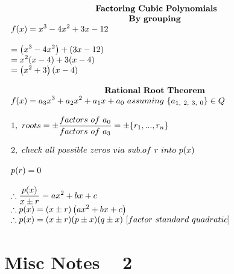 \documentclass{article}
\begin{document}
\begin{multicols}{2}
    \columnbreak
    \noindent 
    \[
    \begin{array}{>{\displaystyle}l}
        \\
        \\
        \\
        \centerline{$\mathbf{Factoring\ Cubic\ Polynomials}$}\\
        \centerline{$\mathbf{By\ grouping\ }$}\\
        f( x) =x^{3} -4x^{2} +3x-12\\
        \\
        =\left( x^{3} -4x^{2}\right) +( 3x-12)\\
        =x^{2}( x-4) +3( x-4)\\
        =\left( x^{2} +3\right)( x-4)\\
        \\
        \centerline{$\mathbf{Rational\ Root\ Theorem\ }$}\\
        f( x) =a_{3} x^{3} +a_{2} x^{2} +a_{1} x+a_{0} \ assuming\ \{a_{1,\ 2,\ 3,\ 0}\} \in Q\\
        \\
        1,\ roots=\pm \frac{factors\ of\ a_{0}}{factors\ of\ a_{3}} =\pm \{r_{1} ,...,r_{n}\}\\
        \\
        2,\ check\ all\ possible\ zeros\ via\ sub.of\ r\ into\ p( x) \ \\
        \\
        p( r) =0\\
        \\
        \therefore \frac{p( x)}{x\pm r} =ax^{2} +bx+c\\
        \therefore p( x) =( x\pm r)\left( ax^{2} +bx+c\right)\\
        \therefore p( x) =( x\pm r)( p\pm x)( q\pm x) \ [ factor\ standard\ quadratic]
        \\
    \end{array}
    \]
\end{multicols}

\newpage

\section{Misc Notes ~ 2}
\end{document}
